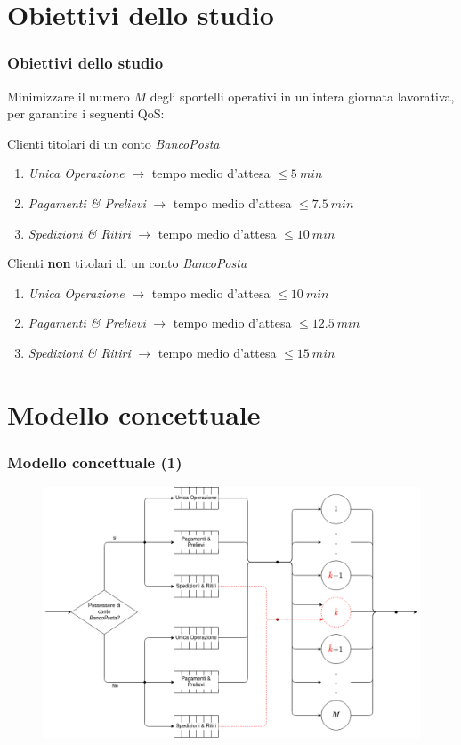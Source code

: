 \documentclass[
	usepdftitle=false,
	xcolor={table, dvipsnames},
	hyperref={
		pdftitle={Studio delle prestazioni di un Ufficio Postale ispirato a Poste Italiane},
    	pdfauthor={A. Chillotti, C. Cuffaro e S. Tiberi}
    }
]{beamer}
\newcommand{\uo}{\textsl{Unica Operazione}}
\newcommand{\pp}{\textsl{Pagamenti \& Prelievi}}
\newcommand{\sr}{\textsl{Spedizioni \& Ritiri}}
\begin{document}
\section{Obiettivi dello studio}
\begin{frame}
\frametitle{Obiettivi dello studio}
Minimizzare il numero $M$ degli sportelli operativi in un'intera giornata lavorativa, per garantire i seguenti QoS:

\begin{block}{Clienti titolari di un conto \textsl{BancoPosta}}
\begin{enumerate}
\item \uo{} $\to$ tempo medio d'attesa $\leq 5\ min$
\item \pp{} $\to$ tempo medio d'attesa $\leq 7.5\ min$
\item \sr{} $\to$ tempo medio d'attesa $\leq 10\ min$
\end{enumerate}
\end{block}

\begin{block}{Clienti \textbf{non} titolari di un conto \textsl{BancoPosta}}
\begin{enumerate}
\item \uo{} $\to$ tempo medio d'attesa $\leq 10\ min$
\item \pp{} $\to$ tempo medio d'attesa $\leq 12.5\ min$
\item \sr{} $\to$ tempo medio d'attesa $\leq 15\ min$
\end{enumerate}
\end{block}
\end{frame}

\section{Modello concettuale}
\begin{frame}
\frametitle{Modello concettuale (1)}
\begin{figure}[ht]
\centering
\includegraphics[width=0.8\linewidth]{modello-concettuale-1}
\end{figure}
\end{frame}
\end{document}
